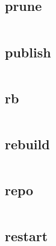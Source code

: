 \begin{lstlisting}[language=bash]

\end{lstlisting}

\subsection{prune}

\begin{lstlisting}[language=bash]

\end{lstlisting}

\subsection{publish}


\begin{lstlisting}[language=bash]

\end{lstlisting}

\subsection{rb}



\begin{lstlisting}[language=bash]

\end{lstlisting}

\subsection{rebuild}




\begin{lstlisting}[language=bash]

\end{lstlisting}

\subsection{repo}


\begin{lstlisting}[language=bash]

\end{lstlisting}

\subsection{restart}

